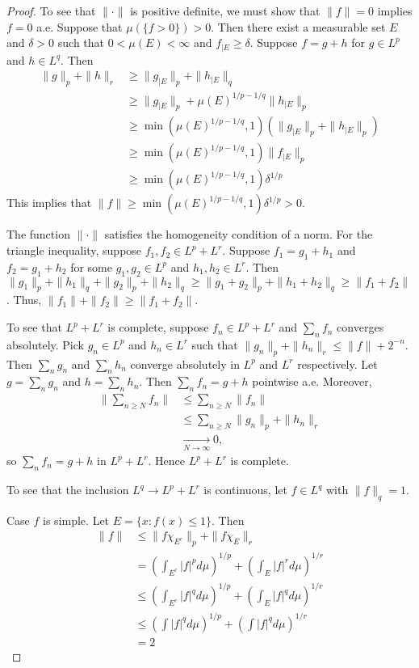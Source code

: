\documentclass{article}
\begin{document}
\begin{proof}
To see that $\|\cdot\|$ is positive definite, we must show that $\|f\| = 0$ implies $f = 0$ a.e.  Suppose that $\mu(\{f > 0\}) > 0$.  Then there exist a measurable set $E$ and $\delta > 0$ such that $0 < \mu(E) < \infty$ and $f_{|E} \ge \delta$. Suppose $f = g + h$ for $g \in L^p$ and $h \in L^q$.  Then 
\begin{align*}
\|g\|_p + \|h\|_r &  \ge \|g_{|E}\|_p + \|h_{|E}\|_q 
\\ &  \ge \|g_{|E}\|_p + \mu(E)^{1/p - 1/q}\|h_{|E}\|_p
\\ & \ge \min(\mu(E)^{1/p - 1/q},1) (\|g_{|E}\|_p + \|h_{|E}\|_p)
\\ & \ge \min(\mu(E)^{1/p - 1/q},1) \|f_{|E}\|_p
\\  & \ge \min(\mu(E)^{1/p - 1/q},1) \delta^{1/p}
\end{align*}
This implies that $\|f\| \ge \min(\mu(E)^{1/p - 1/q},1) \delta^{1/p} > 0$.

The function $\|\cdot\|$ satisfies the homogeneity condition of a norm.  For the triangle inequality, suppose $f_1, f_2 \in L^p + L^r$.  Suppose $f_1 = g_1 + h_1$ and $f_2 = g_1 + h_2$ for some $g_1,g_2 \in L^p$ and $h_1, h_2 \in L^r$. Then $\|g_1\|_p + \|h_1\|_q +  \|g_2\|_p + \|h_2\|_q \ge \|g_1 + g_2\|_p + \|h_1 + h_2\|_q \ge \|f_1 +f_2\|$.  Thus, $\|f_1\| + \|f_2\| \ge \|f_1 + f_2\|$.

To see that $L^p + L^r$ is complete, suppose $f_n \in L^p + L^r$ and $\sum_n f_n$ converges absolutely. Pick $g_n \in L^p$ and $h_n \in L^r$ such that $\|g_n\|_p + \|h_n\|_r \le \|f\| + 2^{-n}$.  Then $\sum_n g_n$ and $\sum_n h_n$ converge absolutely in $L^p$ and $L^r$ respectively.  Let $g = \sum_n g_n$ and $h = \sum_n h_n$. Then $\sum_n f_n = g + h$ pointwise a.e.  Moreover, 
\begin{align*}
\| \sum_{n \ge N} f_n \|  & \le \sum_{n \ge N} \|f_n\|
\\ & \le \sum_{n \ge N} \|g_n\|_p + \|h_n\|_r
\\ & \underset{N \to \infty}{\to} 0,
\end{align*}
so $\sum_n f_n = g+ h$ in $L^p + L^r$.  Hence $L^p + L^r$ is complete.

To see that the inclusion $L^q \to L^p + L^r$ is continuous, let $f \in L^q$ with $\|f\|_q = 1$. 

Case $f$ is simple. Let $E = \{x : f(x) \le 1\}$. Then 
\begin{align*}
\|f\| & \le \|f \chi_{E^c}\|_p + \|f \chi_E\|_r 
\\ & =  \left( \int_{E^c} |f|^p d\mu \right)^{1/p} + \left( \int_{E} |f|^r d\mu \right)^{1/r}
\\ & \le \left( \int_{E^c} |f|^q d\mu \right)^{1/p} + \left( \int_{E} |f|^q d\mu \right)^{1/r}
\\ & \le \left( \int |f|^q d\mu \right)^{1/p} + \left( \int |f|^q d\mu \right)^{1/r}
\\ & = 2
\end{align*}


\end{proof}
\end{document}
